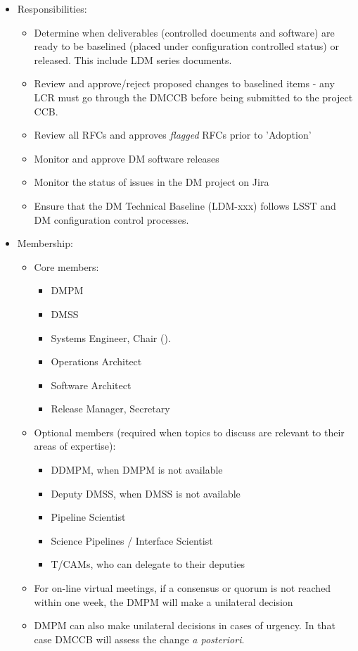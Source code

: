 \begin{itemize}
\item Responsibilities:
        \begin{itemize}
        \item Determine when deliverables (controlled documents and software) are ready to be baselined (placed under configuration controlled status) or released. This include LDM series documents.
        \item Review and approve/reject proposed changes to baselined items - any LCR must go through the DMCCB before being submitted to the project CCB.
        \item Review all RFCs and approves \textit{flagged} RFCs prior to 'Adoption'
        \item Monitor and approve DM software releases
        \item Monitor the status of issues in the DM project on Jira
        \item Ensure that the DM Technical Baseline (LDM-xxx) follows LSST and DM configuration control processes.
        \end{itemize}
\item Membership:
        \begin{itemize}
        \item Core members:
                \begin{itemize}
                \item \gls{DMPM}
                \item \gls{DMSS}
                \item Systems Engineer, Chair ().
                \item Operations Architect
                \item Software Architect
                \item Release Manager, Secretary
                \end{itemize}
        \item Optional members (required when topics to discuss are relevant to their areas of expertise):
                \begin{itemize}
                \item \gls{DDMPM}, when \gls{DMPM} is not available
                \item Deputy \gls{DMSS}, when \gls{DMSS} is not available
                \item Pipeline Scientist
                \item Science Pipelines / Interface Scientist
                \item \glspl{T/CAM}, who can delegate to their deputies
                \end{itemize}
	\item For on-line virtual meetings, if a consensus or quorum is not reached within one week, the \gls{DMPM} will make a unilateral decision
        \item \gls{DMPM} can also make unilateral decisions in cases of urgency. In that case DMCCB will assess the change \textit{a posteriori}.
	\end{itemize}
\end{itemize}

